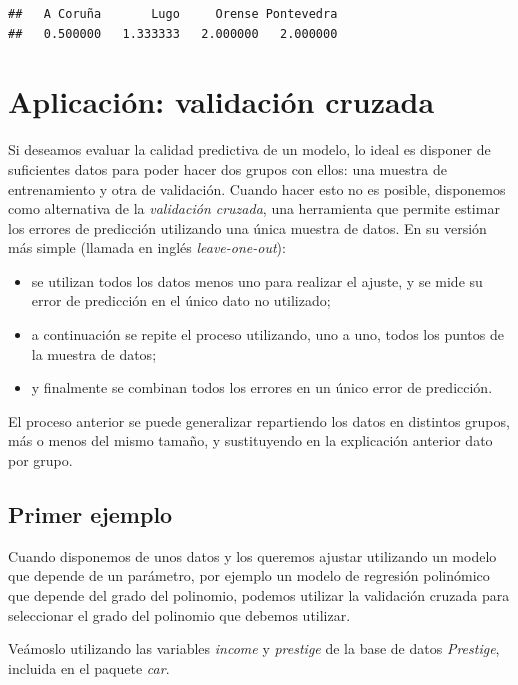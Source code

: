 \documentclass[
]{book}
\theoremstyle{break}
\begin{document}
\begin{verbatim}
##   A Coruña       Lugo     Orense Pontevedra 
##   0.500000   1.333333   2.000000   2.000000
\end{verbatim}

\hypertarget{aplicaciuxf3n-validaciuxf3n-cruzada}{%
\section{Aplicación: validación cruzada}\label{aplicaciuxf3n-validaciuxf3n-cruzada}}

Si deseamos evaluar la calidad predictiva de un modelo, lo ideal es disponer de
suficientes datos para poder hacer dos grupos con ellos: una muestra de entrenamiento
y otra de validación. Cuando hacer esto no es posible, disponemos como alternativa
de la \emph{validación cruzada}, una herramienta que permite estimar los errores de
predicción utilizando una única muestra de datos. En su versión más simple (llamada
en inglés \emph{leave-one-out}):

\begin{itemize}
\item
  se utilizan todos los datos menos uno para realizar el ajuste, y se mide su error de
  predicción en el único dato no utilizado;
\item
  a continuación se repite el proceso
  utilizando, uno a uno, todos los puntos de la muestra de datos;
\item
  y finalmente se combinan todos los errores en un único error de predicción.
\end{itemize}

El proceso anterior se puede generalizar repartiendo los datos en distintos grupos,
más o menos del mismo tamaño, y sustituyendo en la explicación anterior dato por grupo.

\hypertarget{primer-ejemplo}{%
\subsection{Primer ejemplo}\label{primer-ejemplo}}

Cuando disponemos de unos datos y los queremos ajustar utilizando un modelo que
depende de un parámetro, por ejemplo un modelo
de regresión polinómico que depende del grado del polinomio, podemos utilizar
la validación cruzada para seleccionar el grado del polinomio que debemos utilizar.

Veámoslo utilizando las variables \emph{income} y \emph{prestige} de la
base de datos \emph{Prestige}, incluida en el paquete \emph{car}.
\end{document}
